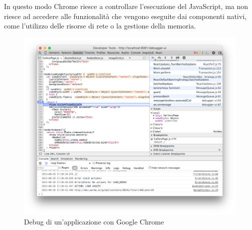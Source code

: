In questo modo Chrome riesce a controllare l'esecuzione del JavaScript, ma non riesce ad accedere alle funzionalità che vengono eseguite dai componenti nativi, come l'utilizzo delle risorse di rete o la gestione della memoria.

\begin{figure}[htp]
\centering
\includegraphics[width=\textwidth]{../immagini/chrome-tools}
\caption{Debug di un'applicazione con Google Chrome}  
\end{figure}


